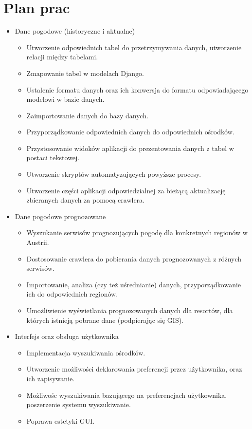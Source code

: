 \documentclass[12pt]{article}
\begin{document}
\section{Plan prac}
\begin{itemize}

\item Dane pogodowe (historyczne i aktualne)
  \begin{itemize}
  \item Utworzenie odpowiednich tabel do przetrzymywania danych, utworzenie relacji między tabelami.
  \item Zmapowanie tabel w modelach Django.
  \item Ustalenie formatu danych oraz ich konwersja do formatu odpowiadającego modelowi w bazie danych.
  \item Zaimportowanie danych do bazy danych.
  \item Przyporządkowanie odpowiednich danych do odpowiednich ośrodków.
  \item Przystosowanie widoków aplikacji do prezentowania danych z tabel w postaci tekstowej.
  \item Utworzenie skryptów automatyzujących powyższe procesy.
  \item Utworzenie części aplikacji odpowiedzialnej za bieżącą aktualizację zbieranych danych za pomocą crawlera.
  \end{itemize}

\item Dane pogodowe prognozowane
  \begin{itemize}
  \item Wyszukanie serwisów prognozujących pogodę dla konkretnych regionów w Austrii.
  \item Dostosowanie crawlera do pobierania danych prognozowanych z różnych serwisów.
  \item Importowanie, analiza (czy też uśrednianie) danych, przyporządkowanie ich do odpowiednich regionów.
  \item Umożliwienie wyświetlania prognozowanych danych dla resortów, dla których istnieją pobrane dane (podpierając się GIS).
  \end{itemize}

\item Interfejs oraz obsługa użytkownika
  \begin{itemize}
  \item Implementacja wyszukiwania ośrodków.
  \item Utworzenie możliwości deklarowania preferencji przez użytkownika, oraz ich zapisywanie.
  \item Możliwośc wyszukiwania bazującego na preferencjach użytkownika, poszerzenie systemu wyszukiwanie.
  \item Poprawa estetyki GUI.
  \end{itemize}


\end{itemize}
\end{document}

